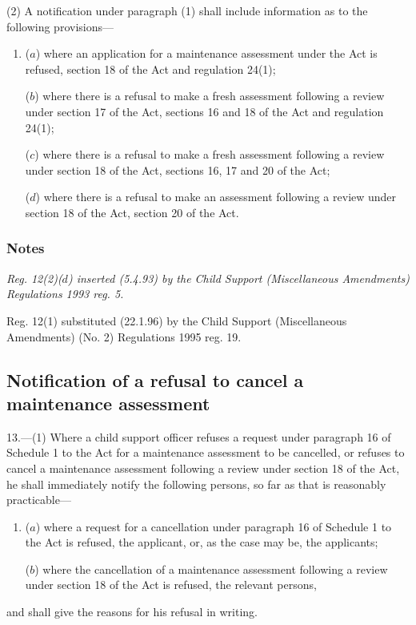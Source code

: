 \documentclass[a4paper]{article}
\newcommand\amendment[1]{\subsubsection*{Notes}{\itshape\frenchspacing\footnotesize #1 \par}}
\begin{document}
(2) A notification under paragraph (1) shall include information as to the following provisions—
\begin{enumerate}\item[]
($a$) where an application for a maintenance assessment under the Act is refused, section 18 of the Act and regulation 24(1);

($b$) where there is a refusal to make a fresh assessment following a review under section 17 of the Act, sections 16 and 18 of the Act and regulation 24(1);

($c$) where there is a refusal to make a fresh assessment following a review under section 18 of the Act, sections 16, 17 and 20 of the Act;

($d$) where there is a refusal to make an assessment following a review under section 18 of the Act, section 20 of the Act.
\end{enumerate}

\amendment{
Reg. 12(2)($d$) inserted (5.4.93) by the Child Support (Miscellaneous Amendments) Regulations 1993 reg. 5.

Reg. 12(1) substituted (22.1.96) by the Child Support (Miscellaneous Amendments) (No. 2) Regulations 1995 reg. 19.
}

\subsection[13. Notification of a refusal to cancel a maintenance assessment]{Notification of a refusal to cancel a maintenance assessment}

13.—(1) Where a child support officer refuses a request under paragraph 16 of Schedule 1 to the Act for a maintenance assessment to be cancelled, or refuses to cancel a maintenance assessment following a review under section 18 of the Act, he shall immediately notify the following persons, so far as that is reasonably practicable—
\begin{enumerate}\item[]
($a$) where a request for a cancellation under paragraph 16 of Schedule 1 to the Act is refused, the applicant, or, as the case may be, the applicants;

($b$) where the cancellation of a maintenance assessment following a review under section 18 of the Act is refused, the relevant persons,
\end{enumerate}
and shall give the reasons for his refusal in writing.
\end{document}
